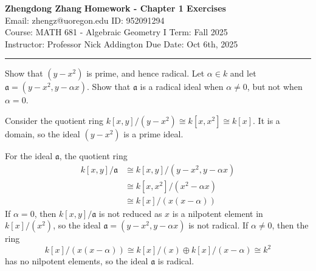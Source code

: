 \documentclass[letterpaper, 12pt]{article}
\begin{document}
\noindent
\large\textbf{Zhengdong Zhang} \hfill \textbf{Homework - Chapter 1 Exercises}   \\
Email: zhengz@uoregon.edu \hfill ID: 952091294 \\
\normalsize Course: MATH 681 - Algebraic Geometry I \hfill Term: Fall 2025 \\
Instructor: Professor Nick Addington \hfill Due Date: Oct 6th, 2025 \\
\noindent\rule{7in}{2.8pt}
\begin{problem}{1.1}
Show that \((y-x^2)\) is prime, and hence radical. Let \(\alpha\in k\) and let \(\mathfrak{a}=(y-x^2,y-\alpha x)\). Show that \(\mathfrak{a}\) is a radical ideal when \(\alpha\neq 0\), but not when \(\alpha=0\).
\end{problem}
\begin{solution}
Consider the quotient ring \(k[x,y]/(y-x^2)\cong k[x,x^2]\cong k[x]\). It is a domain, so the ideal \((y-x^2)\) is a prime ideal. 

For the ideal \(\mathfrak{a}\), the quotient ring 
\begin{align*}
     k[x,y]/\mathfrak{a}&\cong k[x,y]/(y-x^2,y-\alpha x)\\ 
                        &\cong k[x,x^2]/(x^2-\alpha x)\\ 
                        &\cong k[x]/(x(x-\alpha))
\end{align*}
If \(\alpha=0\), then \(k[x,y]/\mathfrak{a}\) is not reduced as \(x\) is a nilpotent element in \(k[x]/(x^2)\), so the ideal \(\mathfrak{a}=(y-x^2,y-\alpha x)\) is not radical. If \(\alpha\neq 0\), then the ring 
\[k[x]/(x(x-\alpha))\cong k[x]/(x)\oplus k[x]/(x-\alpha)\cong k^2\] 
has no nilpotent elements, so the ideal \(\mathfrak{a}\) is radical.
\end{solution}
\end{document}
